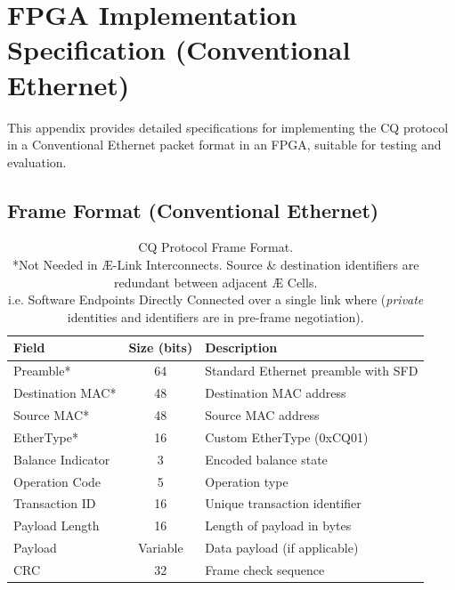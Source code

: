 \documentclass[../OAE-SPEC-MAIN.tex]{subfiles}
\begin{document}
\newpage{}






\newpage
\section{FPGA Implementation Specification (Conventional Ethernet)}

This appendix provides detailed specifications for implementing the CQ protocol in a Conventional Ethernet packet format in an FPGA, suitable for testing and evaluation.

\subsection{Frame Format (Conventional Ethernet)}


\begin{table}[h]
\hspace{-8pt}
\begin{tabular}{|l|c|l|}
\hline
\textbf{Field} & \textbf{Size (bits)} & \textbf{Description} \\
\hline
Preamble* & 64 & Standard Ethernet preamble with SFD \\
Destination MAC* & 48 & Destination MAC address \\
Source MAC* & 48 & Source MAC address \\
EtherType* & 16 & Custom EtherType (0xCQ01) \\
Balance Indicator & 3 & Encoded balance state \\
Operation Code & 5 & Operation type \\
Transaction ID & 16 & Unique transaction identifier \\
Payload Length & 16 & Length of payload in bytes \\
Payload & Variable & Data payload (if applicable) \\
CRC & 32 & Frame check sequence \\
\hline
\end{tabular}
\caption{CQ Protocol Frame Format. \\  \vspace{5pt} *Not Needed in Æ-Link Interconnects. Source \& destination identifiers are redundant between adjacent Æ Cells. \\i.e. Software Endpoints Directly Connected over a single link where (\emph{private} identities and identifiers are in pre-frame negotiation).}
\end{table}
\end{document}
